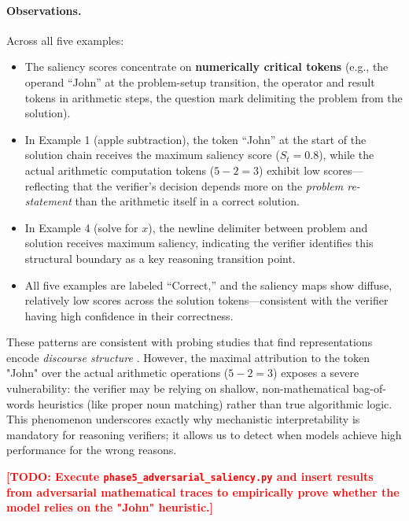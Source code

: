 \documentclass{article}
\begin{document}
\paragraph{Observations.} Across all five examples:
\begin{itemize}[topsep=2pt, itemsep=1pt]
  \item The saliency scores concentrate on \textbf{numerically critical tokens} (e.g., the operand ``John'' at the problem-setup transition, the operator and result tokens in arithmetic steps, the question mark delimiting the problem from the solution).
  \item In Example 1 (apple subtraction), the token ``John'' at the start of the solution chain receives the maximum saliency score ($S_t = 0.8$), while the actual arithmetic computation tokens ($5 - 2 = 3$) exhibit low scores---reflecting that the verifier's decision depends more on the \emph{problem re-statement} than the arithmetic itself in a correct solution.
  \item In Example 4 (solve for $x$), the newline delimiter between problem and solution receives maximum saliency, indicating the verifier identifies this structural boundary as a key reasoning transition point.
  \item All five examples are labeled ``Correct,'' and the saliency maps show diffuse, relatively low scores across the solution tokens---consistent with the verifier having high confidence in their correctness.
\end{itemize}

These patterns are consistent with probing studies that find representations encode \emph{discourse structure} \citep{tenney2019bert}. However, the maximal attribution to the token "John" over the actual arithmetic operations ($5-2=3$) exposes a severe vulnerability: the verifier may be relying on shallow, non-mathematical bag-of-words heuristics (like proper noun matching) rather than true algorithmic logic. This phenomenon underscores exactly why mechanistic interpretability is mandatory for reasoning verifiers; it allows us to detect when models achieve high performance for the wrong reasons.

\textcolor{red}{\textbf{[TODO: Execute \texttt{phase5\_adversarial\_saliency.py} and insert results from adversarial mathematical traces to empirically prove whether the model relies on the "John" heuristic.]}}
\end{document}
